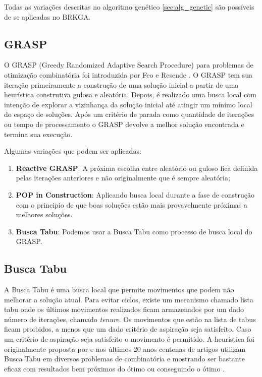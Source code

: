 \documentclass[conference]{IEEEtran}
\begin{document}
        Todas as variações descritas no algoritmo genético \ref{sec:alg_genetic} são possíveis de se aplicadas no BRKGA. 

\subsection{GRASP}
\label{sec:grasp}

    O GRASP (Greedy Randomized Adaptive Search Procedure) para problemas de otimização combinatória foi introduzida por Feo e Resende \cite{feo1989probabilistic}. O GRASP tem sua iteração
    primeiramente a construção de uma solução inicial a partir de uma heurística construtiva gulosa e aleatória. Depois, é realizado uma busca local com intenção de explorar a vizinhança da
    solução inicial até atingir um mínimo local do espaço de soluções. Após um critério de parada como quantidade de iterações ou tempo de processamento o GRASP devolve a melhor solução
    encontrada e termina sua execução.

    Algumas variações que podem ser aplicadas:
    \begin{enumerate}

        \item \textbf{Reactive GRASP}: A próxima escolha entre aleatório ou guloso fica definida pelas iterações anteriores e não originalmente que é sempre aleatória;

        \item \textbf{POP in Construction}: Aplicando busca local durante a fase de construção com o principio de que boas soluções estão mais provavelmente próximas a melhores soluções.

        \item \textbf{Busca Tabu}: Podemos usar a Busca Tabu como processo de busca local do GRASP.
    \end{enumerate}




\subsection{Busca Tabu}
\label{sec:busca_tabu}

    A Busca Tabu é uma busca local que permite movimentos que podem não melhorar a solução atual. Para evitar ciclos, existe um mecanismo chamado lista tabu onde os últimos movimentos realizados
    ficam armazenados por um dado número de iterações, chamado \textit{tenure}. Os movimentos que estão na lista de tabus ficam proibidos, a menos que um dado critério de aspiração seja
    satisfeito. Caso um critério de aspiração seja satisfeito o movimento é permitido. A heurística foi originalmente proposta por \cite{glover1986future} \cite{glover1986future} e nos
    últimos 20 anos centenas de artigos utilizam Busca Tabu em diversos problemas de combinatória e mostrando ser bastante eficaz com resultados bem próximos do ótimo ou conseguindo o ótimo
    \cite{gendreau2010handbook}.
\end{document}
